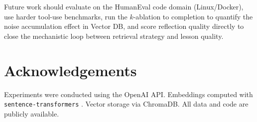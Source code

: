 \documentclass{article}
\begin{document}
Future work should evaluate on the HumanEval code domain (Linux/Docker), use
harder tool-use benchmarks, run the $k$-ablation to completion to quantify the
noise accumulation effect in Vector DB, and score reflection quality directly
to close the mechanistic loop between retrieval strategy and lesson quality.

\section*{Acknowledgements}
Experiments were conducted using the OpenAI API. Embeddings computed with
\texttt{sentence-transformers} \citep{reimers2019sentencebert}. Vector storage
via ChromaDB. All data and code are publicly available.



\end{document}
